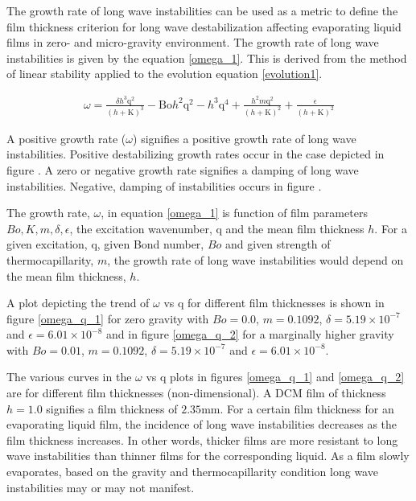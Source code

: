 \documentclass[a4paper,12pt]{article}
\begin{document}
The growth rate of long wave instabilities can be used as a metric to define the film thickness criterion for long wave destabilization affecting evaporating liquid films in zero- and micro-gravity environment. The growth rate of long wave instabilities is given by the equation \ref{omega_1}. This is derived from the method of linear stability applied to the evolution equation \ref{evolution1}.

\begin{align} \label{omega_1}
\omega = \frac{\delta  h^3 \text{q}^2}{(h+\text{K})^3}-\text{Bo} h^2 \text{q}^2-h^3 \text{q}^4 +\frac{h^2 m \text{q}^2}{(h+\text{K})^2}+\frac{\epsilon}{(h+\text{K})^2}
\end{align}

A positive growth rate ($\omega$) signifies a positive growth rate of long wave instabilities. Positive destabilizing growth rates occur in the case depicted in figure . A zero or negative growth rate signifies a damping of long wave instabilities. Negative, damping of instabilities occurs in figure .

The growth rate, $\omega$, in equation \ref{omega_1} is function of film parameters $Bo, K, m, \delta, \epsilon$, the excitation wavenumber, q and the mean film thickness $h$. For a given excitation, q, given Bond number, $Bo$ and given strength of thermocapillarity, $m$, the growth rate of long wave instabilities would depend on the mean film thickness, $h$.

A plot depicting the trend of $\omega$ vs q for different film thicknesses is shown in figure \ref{omega_q_1} for zero gravity with $Bo=0.0$, $m=0.1092$, $\delta=5.19 \times 10^{-7}$ and $\epsilon=6.01 \times 10^{-8}$ and in figure \ref{omega_q_2} for a marginally higher gravity with $Bo=0.01$, $m=0.1092$, $\delta=5.19 \times 10^{-7}$ and $\epsilon=6.01 \times 10^{-8}$.

The various curves in the $\omega$ vs q plots in figures \ref{omega_q_1} and \ref{omega_q_2} are for different film thicknesses (non-dimensional). A DCM film of thickness $h=1.0$ signifies a film thickness of $2.35$mm. For a certain film thickness for an evaporating liquid film, the incidence of long wave instabilities decreases as the film thickness increases. In other words, thicker films are more resistant to long wave instabilities than thinner films for the corresponding liquid. As a film slowly evaporates, based on the gravity and thermocapillarity condition long wave instabilities may or may not manifest.
\end{document}
